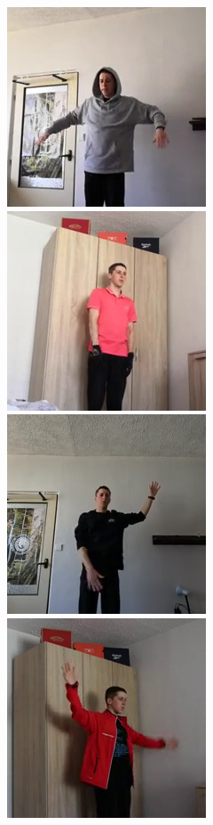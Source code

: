 \begin{figure}[!ht]
{    }
    \vspace{0.1cm}
    \centerline{
        \includegraphics[scale=0.46]{figures/dataset_upper_body/scene022_cam2_image00066.png}
        \includegraphics[scale=0.46]{figures/dataset_upper_body/scene029_cam2_image00153.png}
        \includegraphics[scale=0.46]{figures/dataset_upper_body/scene023_cam1_image00006.png}
        \includegraphics[scale=0.46]{figures/dataset_upper_body/scene028_cam0_image00224.png}
}
\end{figure}
